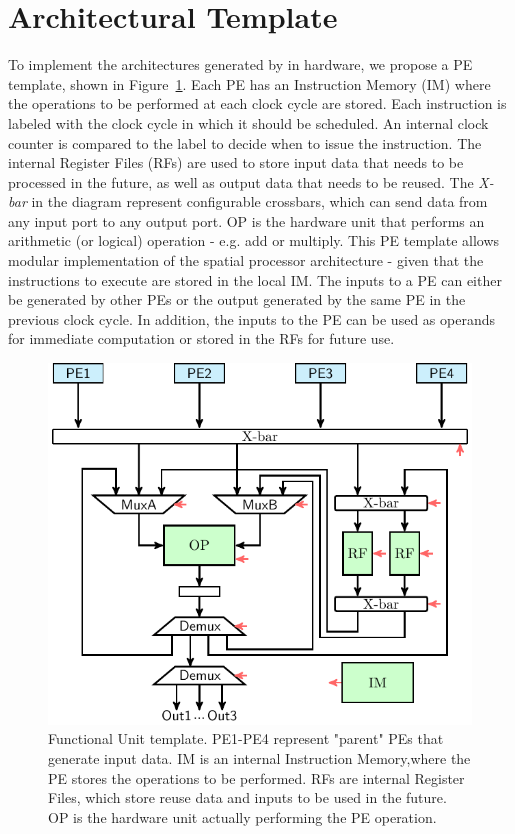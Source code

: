 \vspace{-2mm}
\section{Architectural Template}
\label{sec:arch_template}
To implement the architectures generated by \frameworkname in hardware, we propose a PE template, shown in Figure~\ref{fig:FU_templ}. Each PE has an Instruction Memory (IM) where the operations to be performed at each clock cycle are stored. Each instruction is labeled with the clock cycle in which it should be scheduled. An internal clock counter is compared to the label to decide when to issue the instruction. The internal Register Files (RFs) are used to store input data that needs to be processed in the future, as well as output data that needs to be reused. The \textit{X-bar} in the diagram represent configurable crossbars, which can send data from any input port to any output port. OP is the hardware unit that performs an arithmetic (or logical) operation - e.g. add or multiply.
This PE template allows modular implementation of the spatial processor architecture - given that the instructions to execute are stored in the local IM. The inputs to a PE can either be generated by other PEs or the output generated by the same PE in the previous clock cycle. In addition, the inputs to the PE can be used as operands for immediate computation or stored in the RFs for future use. %

\begin{figure}[tb]
\centering
\includegraphics[width=.5\columnwidth]{images/functional_unit.pdf}
    \caption{\small Functional Unit template. PE1-PE4 represent "parent" PEs that generate input data. IM is an internal Instruction Memory,where the PE stores the operations to be performed. RFs are internal Register Files, which store reuse data and inputs to be used in the future. OP is the hardware unit actually performing the PE operation.}
\label{fig:FU_templ}
\squeezeup
\squeezeup
\end{figure}
